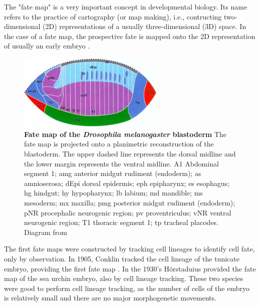 The "fate map" is a very important concept in developmental biology. 
Its name refers to the practice of cartography (or map making), i.e., contructing two-dimensional (2D) representations of a usually three-dimensional (3D) space.
In the case of a fate map, the prospective fate is mapped onto the 2D representation of usually an early embryo \citep{gilbert2007fatemap}.
\begin{figure}[h]
  \includegraphics[width=7cm]{./Images/blastoderm_fatemap_small.jpg}
  \centering
  \caption{\textbf{Fate map of the \textit{Drosophila melanogaster} blastoderm}
  			The fate map is projected onto a planimetric reconstruction of the blastoderm. 
  			The upper dashed line represents the dorsal midline and the lower margin represents 
  			the ventral midline.
  			A1 Abdominal segment 1; amg anterior midgut rudiment (endoderm); as amnioserosa; 
  			dEpi dorsal epidermis; eph epipharynx; es esophagus; hg hindgut; hy hypopharynx; 
  			lb labium; md mandible; ms mesoderm; mx maxilla;
  			pmg posterior midgut rudiment (endoderm); pNR procephalic neurogenic region; 
  			pv proventriculus; vNR ventral neurogenic region; T1 thoracic segment 1; 
  			tp tracheal placodes.
  			Diagram from \citet{Hartenstein1993} }
  \label{fig:blastoderm_fatemap}
\end{figure}
The first fate maps were constructed by tracking cell lineages to identify cell fate, only by observation. In 1905, Conklin tracked the cell lineage of the tunicate embryo, providing the first fate map \citep{Conklin1905}. 
In the 1930's H\"{o}rstaduius provided the fate map of the sea urchin embryo, also by cell lineage tracking. These two species were good to perform cell lineage tracking, as the number of cells of the embryo is relatively small and there are no major morphogenetic movements.


